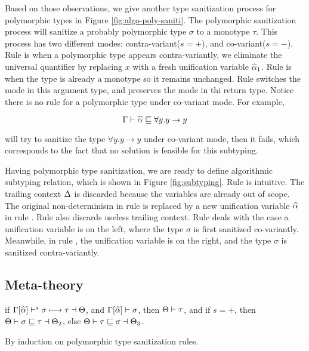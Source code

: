 Based on those observations, we give another type sanitization process for
polymorphic types in Figure \ref{fig:algo-poly-saniti}. The polymorphic
sanitization process will sanitize a probably polymorphic type $\sigma$ to a
monotype $\tau$. This process has two different modes:
contra-variant($s=+$), and co-variant($s = -$). Rule  is when a
polymorphic type appears contra-variantly, we eliminate the universal
quantifier by replacing $x$ with a fresh unification variable $\widehat{\alpha}_1$. Rule
 is when the type is already a monotype so it remains unchanged.
Rule  switches the mode in this argument type, and preserves the mode in
thi return type. Notice there is no rule for a polymorphic type under co-variant
mode. For example,

\[
\Gamma {} \vdash \widehat{\alpha} \sqsubseteq \forall y .y \to y
\]

\noindent will try to sanitize the type $\forall y. y \to y$ under co-variant
mode, then it fails, which corresponds to the
fact that no solution is feasible for this subtyping.

Having polymorphic type sanitization, we are ready to define algorithmic subtyping
relation, which is shown in Figure \ref{fig:subtyping}. Rule  is
intuitive. The trailing context $\Delta$ is discarded because the variables are
already out of scope. The original
non-determinism in rule  is replaced by a new unification variable
$\widehat{\alpha}$ in rule . Rule  also discards useless trailing
context.
Rule  deals with the case a unification variable is on
the left, where the type $\sigma$ is first sanitized co-variantly.
Meanwhile, in rule , the unification variable is on the right,
and the type $\sigma$ is sanitized contra-variantly.

\subsection{Meta-theory}

\begin{conjecture}
  if $\Gamma[\widehat{\alpha}] \vdash^s \sigma \longmapsto \tau \dashv \Theta$,
  and $\Gamma[\widehat{\alpha}] \vdash \sigma$,
  then $\Theta \vdash \tau$,
  and if $s=+$, then $\Theta \vdash \sigma \sqsubseteq \tau \dashv \Theta_2$,
  else $\Theta \vdash \tau \sqsubseteq \sigma \dashv \Theta_3$.
\end{conjecture}
\begin{hproof}
  By induction on polymorphic type sanitization rules.
\end{hproof}

